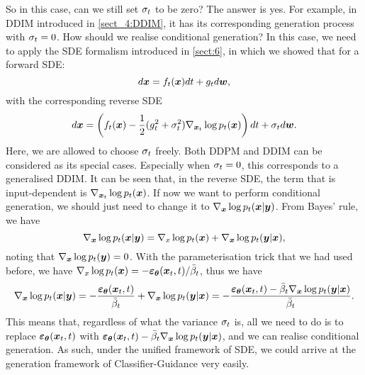 So in this case, can we still set $\sigma_t$ to be zero? The answer is yes. For example, in DDIM introduced in \cref{sect_4:DDIM}, it has its corresponding generation process with $\sigma_t=0$. How should we realise conditional generation? In this case, we need to apply the SDE formalism introduced in \cref{sect:6}, in which we showed that for a forward SDE:
\begin{equation}
    \label{eq:9.16}
    d\bm{x}=f_t (\bm{x})dt+g_t d\bm{w},
\end{equation}
with the corresponding reverse SDE
\begin{equation}
    \label{eq:9.17}
    d\bm{x}=\left(f_t(\bm{x})-\frac{1}{2}(g_t^2+\sigma_t^2)\nabla_{\bm{x}_{t}}\log p_t(\bm{x})\right)dt+\sigma_t d\bm{w}.
\end{equation}
Here, we are allowed to choose $\sigma_t$ freely. Both DDPM and DDIM can be considered as its special cases. Especially when $\sigma_t=0$, this corresponds to a generalised DDIM. It can be seen that, in the reverse SDE, the term that is input-dependent is $\nabla_{\bm{x}_{t}}\log p_t(\bm{x})$. If now we want to perform conditional generation, we should just need to change it to $\nabla_{\bm{x}}\log p_t(\bm{x}|\bm{y})$. From Bayes' rule, we have
\begin{equation}
    \label{eq:9.18}
    \nabla_{\bm{x}}\log p_t(\bm{x}|\bm{y}) = \nabla_{x}\log p_t (\bm{x})+\nabla_{\bm{x}}\log p_t (\bm{y}|\bm{x}),
\end{equation}
noting that $\nabla_{\bm{x}}\log p_t (\bm{y})=0$. With the parameterisation trick that we had used before, we have $\nabla_{x}\log p_t (\bm{x})=-\bm{\varepsilon}_{\bm{\theta}}(\bm{x}_{t},t)/\bar{\beta}_t$, thus we have
\begin{equation}
    \label{eq:9.19}
    \nabla_{\bm{x}}\log p_t(\bm{x}|\bm{y}) = -\frac{\bm{\varepsilon}_{\bm{\theta}}(\bm{x}_{t},t)}{\bar{\beta}_t}+\nabla_{\bm{x}}\log p_t (\bm{y}|\bm{x})=-\frac{\bm{\varepsilon}_{\bm{\theta}}(\bm{x}_{t},t)-\bar{\beta}_t\nabla_{\bm{x}}\log p_t (\bm{y}|\bm{x}) }{\bar{\beta}_t}.
\end{equation}
This means that, regardless of what the variance $\sigma_t$ is, all we need to do is to replace $\bm{\varepsilon}_{\bm{\theta}}(\bm{x}_{t},t)$ with $\bm{\varepsilon}_{\bm{\theta}}(\bm{x}_{t},t)-\bar{\beta}_t\nabla_{\bm{x}}\log p_t (\bm{y}|\bm{x})$, and we can realise conditional generation. As such, under the unified framework of SDE, we could arrive at the generation framework of Classifier-Guidance very easily.

